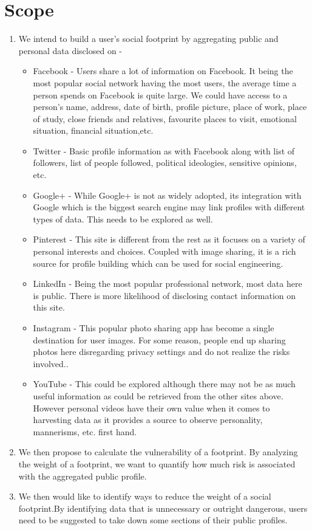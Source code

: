 \documentclass[11pt]{article}
\begin{document}
\section{Scope}
\begin{enumerate}

\item We intend to build a user’s social footprint by aggregating public and personal data disclosed on - 
  \begin{itemize}
   \item Facebook - Users share a lot of information on Facebook. It being the most popular social network having the most users, the average time a person spends on Facebook is quite large. We could have access to a person’s name, address, date of birth, profile picture, place 	of work, place of study, close friends and relatives, favourite places to visit, emotional situation, financial situation,etc. 
   \item Twitter - Basic profile information as with Facebook along with list of followers, list of people followed, political ideologies, sensitive opinions, etc.
   \item Google+ - While Google+ is not as widely adopted, its integration with Google which is the biggest search engine may link profiles with different types of data. This needs to be explored as well.
   \item Pinterest - This site is different from the rest as it focuses on a variety of personal interests and choices. Coupled with image sharing, it is a rich source for profile building which can be used for social engineering.
   \item LinkedIn - Being the most popular professional network, most data here is public. There is more likelihood of disclosing contact information on this site.
   \item Instagram - This popular photo sharing app has become a single destination for user images. For some reason, people end up sharing photos here disregarding privacy settings and do not realize the risks involved..
   \item YouTube - This could be explored although there may not be as much useful information as could be retrieved from the other sites above. However personal videos have their own value when it comes to harvesting data as it provides a source to observe personality, mannerisms, etc. first hand.
    \end{itemize}

\item We then propose to calculate the vulnerability of a footprint. By analyzing the weight of a footprint, we want to quantify how much risk is associated with the aggregated public profile. 
\item We then would like to identify ways to reduce the weight of a social footprint.By identifying data that is unnecessary or outright dangerous, users need to be suggested to take down some sections of their public profiles.
\end{enumerate}
\end{document}
